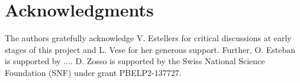 \section{Acknowledgments}
%
The authors gratefully acknowledge V. Estellers for critical discussions at early stages of this project and L. Vese for her generous support.
Further, O. Esteban is supported by .... D. Zosso is supported by the Swiss National Science Foundation (SNF) under grant PBELP2-137727. 
